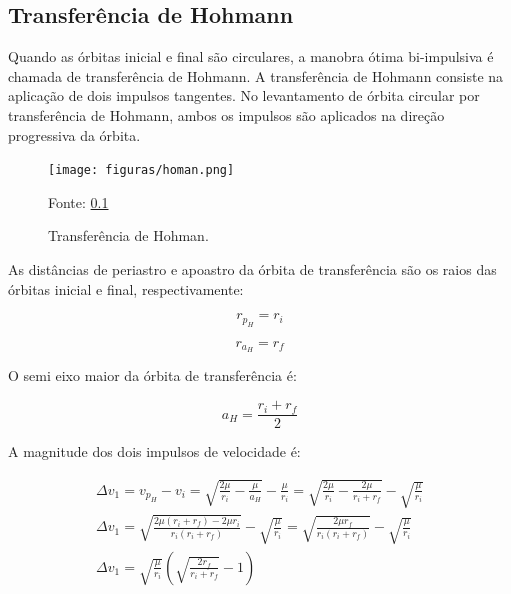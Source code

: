 \subsection{Transferência de Hohmann}

\par Quando as órbitas inicial e final são circulares, a manobra ótima bi-impulsiva é chamada de transferência de Hohmann. A transferência de Hohmann consiste na aplicação de dois impulsos tangentes. No levantamento de órbita circular por transferência de Hohmann, ambos os impulsos são aplicados na direção progressiva da órbita.

\begin{figure}[H]
        \centering
        \texttt{[image: figuras/homan.png]}
        \caption{Transferência de Hohman.}
        Fonte: \ref{}
        \label{fig:homan}
\end{figure} 

\par As distâncias de periastro e apoastro da órbita de transferência são os raios das órbitas inicial e final, respectivamente:

\begin{equation}
r_{p_H}=r_i
\end{equation}

\begin{equation}
r_{a_H}=r_f
\end{equation}

\par O semi eixo maior da órbita de transferência é:

\begin{equation}
a_H=\frac{r_i+r_f}{2}
\end{equation}

\par A magnitude dos dois impulsos de velocidade é:

\begin{equation}
\begin{gathered}
\Delta v_1=v_{p_H}-v_i=\sqrt{\frac{2 \mu}{r_i}-\frac{\mu}{a_H}}-\frac{\mu}{r_i}=\sqrt{\frac{2 \mu}{r_i}-\frac{2 \mu}{r_i+r_f}}-\sqrt{\frac{\mu}{r_i}} \\
\Delta v_1=\sqrt{\frac{2 \mu\left(r_i+r_f\right)-2 \mu r_i}{r_i\left(r_i+r_f\right)}}-\sqrt{\frac{\mu}{r_i}}=\sqrt{\frac{2 \mu r_f}{r_i\left(r_i+r_f\right)}}-\sqrt{\frac{\mu}{r_i}} \\
\Delta v_1=\sqrt{\frac{\mu}{r_i}}\left(\sqrt{\frac{2 r_f}{r_i+r_f}}-1\right)
\label{eq:delta1}
\end{gathered}
\end{equation}


